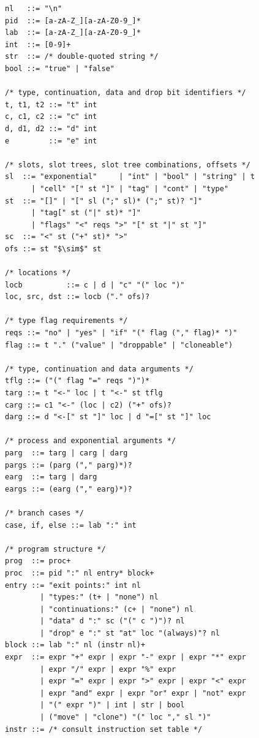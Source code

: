 \begin{figure}
\begin{lstlisting}[language=BNF,mathescape=true,frame=single,basicstyle=\ttfamily\footnotesize,caption={BNF Grammar of the Intermediate Representation},captionpos=t,label={lst:IRsyntax}]
nl   ::= "\n"
pid  ::= [a-zA-Z_][a-zA-Z0-9_]*
lab  ::= [a-zA-Z_][a-zA-Z0-9_]*
int  ::= [0-9]+
str  ::= /* double-quoted string */
bool ::= "true" | "false"

/* type, continuation, data and drop bit identifiers */
t, t1, t2 ::= "t" int
c, c1, c2 ::= "c" int
d, d1, d2 ::= "d" int
e         ::= "e" int

/* slots, slot trees, slot tree combinations, offsets */
sl  ::= "exponential"     | "int" | "bool" | "string" | t
      | "cell" "[" st "]" | "tag" | "cont" | "type"   
st  ::= "[]" | "[" sl (";" sl)* (";" st)? "]"
      | "tag[" st ("|" st)* "]"
      | "flags" "<" reqs ">" "[" st "|" st "]"
sc  ::= "<" st ("+" st)* ">"
ofs ::= st "$\sim$" st

/* locations */
locb          ::= c | d | "c" "(" loc ")"
loc, src, dst ::= locb ("." ofs)?

/* type flag requirements */
reqs ::= "no" | "yes" | "if" "(" flag ("," flag)* ")"
flag ::= t "." ("value" | "droppable" | "cloneable")

/* type, continuation and data arguments */
tflg ::= ("(" flag "=" reqs ")")*
targ ::= t "<-" loc | t "<-" st tflg
carg ::= c1 "<-" (loc | c2) ("+" ofs)?
darg ::= d "<-[" st "]" loc | d "=[" st "]" loc 

/* process and exponential arguments */
parg  ::= targ | carg | darg
pargs ::= (parg ("," parg)*)?
earg  ::= targ | darg
eargs ::= (earg ("," earg)*)?

/* branch cases */
case, if, else ::= lab ":" int

/* program structure */
prog  ::= proc+
proc  ::= pid ":" nl entry* block+
entry ::= "exit points:" int nl
        | "types:" (t+ | "none") nl
        | "continuations:" (c+ | "none") nl
        | "data" d ":" sc ("(" c ")")? nl
        | "drop" e ":" st "at" loc "(always)"? nl
block ::= lab ":" nl (instr nl)+
expr  ::= expr "+" expr | expr "-" expr | expr "*" expr
        | expr "/" expr | expr "%" expr 
        | expr "=" expr | expr ">" expr | expr "<" expr
        | expr "and" expr | expr "or" expr | "not" expr
        | "(" expr ")" | int | str | bool
        | ("move" | "clone") "(" loc "," sl ")"
instr ::= /* consult instruction set table */
\end{lstlisting}
\end{figure}
